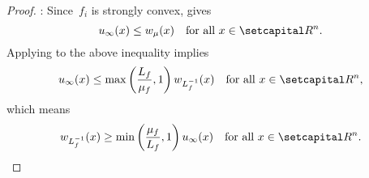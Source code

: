 \documentclass[../main]{subfiles}
\begin{document}
\begin{proof}
    :
    Since~$f_i$ is strongly convex,  gives
    \begin{equation}
        u_\infty(x) \le w_\mu(x) \forallcondition{x \in \setR^n}
    .\end{equation}
    Applying  to the above inequality implies
    \begin{equation}
        u_\infty(x) \le \max \left( \frac{L_f}{\mu_f}, 1 \right) w_{L_f^{-1}}(x) \forallcondition{x \in \setR^n}
    ,\end{equation}
    which means
    \begin{equation}
        w_{L_f^{-1}}(x) \ge \min \left( \frac{\mu_f}{L_f}, 1 \right) u_\infty(x) \forallcondition{x \in \setR^n}
    .\end{equation}


\end{proof}
\end{document}
